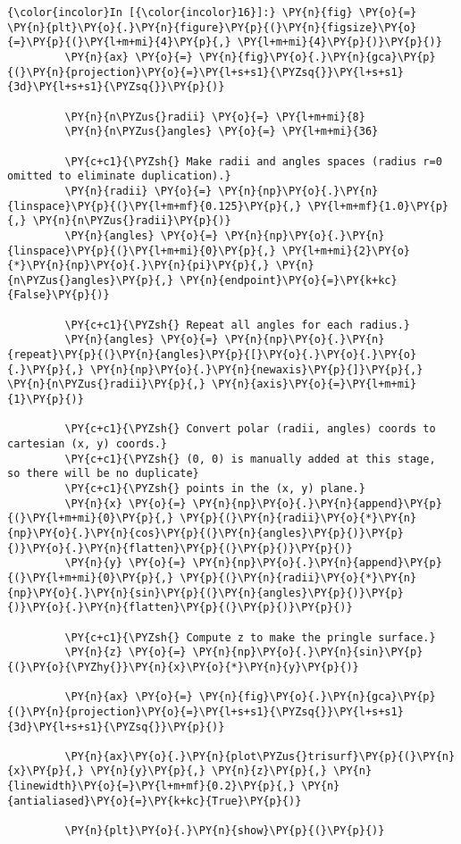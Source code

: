     \begin{Verbatim}[commandchars=\\\{\},frame=single,framerule=0.3mm,rulecolor=\color{cellframecolor}]
{\color{incolor}In [{\color{incolor}16}]:} \PY{n}{fig} \PY{o}{=} \PY{n}{plt}\PY{o}{.}\PY{n}{figure}\PY{p}{(}\PY{n}{figsize}\PY{o}{=}\PY{p}{(}\PY{l+m+mi}{4}\PY{p}{,} \PY{l+m+mi}{4}\PY{p}{)}\PY{p}{)}
         \PY{n}{ax} \PY{o}{=} \PY{n}{fig}\PY{o}{.}\PY{n}{gca}\PY{p}{(}\PY{n}{projection}\PY{o}{=}\PY{l+s+s1}{\PYZsq{}}\PY{l+s+s1}{3d}\PY{l+s+s1}{\PYZsq{}}\PY{p}{)}
         
         \PY{n}{n\PYZus{}radii} \PY{o}{=} \PY{l+m+mi}{8}
         \PY{n}{n\PYZus{}angles} \PY{o}{=} \PY{l+m+mi}{36}
         
         \PY{c+c1}{\PYZsh{} Make radii and angles spaces (radius r=0 omitted to eliminate duplication).}
         \PY{n}{radii} \PY{o}{=} \PY{n}{np}\PY{o}{.}\PY{n}{linspace}\PY{p}{(}\PY{l+m+mf}{0.125}\PY{p}{,} \PY{l+m+mf}{1.0}\PY{p}{,} \PY{n}{n\PYZus{}radii}\PY{p}{)}
         \PY{n}{angles} \PY{o}{=} \PY{n}{np}\PY{o}{.}\PY{n}{linspace}\PY{p}{(}\PY{l+m+mi}{0}\PY{p}{,} \PY{l+m+mi}{2}\PY{o}{*}\PY{n}{np}\PY{o}{.}\PY{n}{pi}\PY{p}{,} \PY{n}{n\PYZus{}angles}\PY{p}{,} \PY{n}{endpoint}\PY{o}{=}\PY{k+kc}{False}\PY{p}{)}
         
         \PY{c+c1}{\PYZsh{} Repeat all angles for each radius.}
         \PY{n}{angles} \PY{o}{=} \PY{n}{np}\PY{o}{.}\PY{n}{repeat}\PY{p}{(}\PY{n}{angles}\PY{p}{[}\PY{o}{.}\PY{o}{.}\PY{o}{.}\PY{p}{,} \PY{n}{np}\PY{o}{.}\PY{n}{newaxis}\PY{p}{]}\PY{p}{,} \PY{n}{n\PYZus{}radii}\PY{p}{,} \PY{n}{axis}\PY{o}{=}\PY{l+m+mi}{1}\PY{p}{)}
         
         \PY{c+c1}{\PYZsh{} Convert polar (radii, angles) coords to cartesian (x, y) coords.}
         \PY{c+c1}{\PYZsh{} (0, 0) is manually added at this stage,  so there will be no duplicate}
         \PY{c+c1}{\PYZsh{} points in the (x, y) plane.}
         \PY{n}{x} \PY{o}{=} \PY{n}{np}\PY{o}{.}\PY{n}{append}\PY{p}{(}\PY{l+m+mi}{0}\PY{p}{,} \PY{p}{(}\PY{n}{radii}\PY{o}{*}\PY{n}{np}\PY{o}{.}\PY{n}{cos}\PY{p}{(}\PY{n}{angles}\PY{p}{)}\PY{p}{)}\PY{o}{.}\PY{n}{flatten}\PY{p}{(}\PY{p}{)}\PY{p}{)}
         \PY{n}{y} \PY{o}{=} \PY{n}{np}\PY{o}{.}\PY{n}{append}\PY{p}{(}\PY{l+m+mi}{0}\PY{p}{,} \PY{p}{(}\PY{n}{radii}\PY{o}{*}\PY{n}{np}\PY{o}{.}\PY{n}{sin}\PY{p}{(}\PY{n}{angles}\PY{p}{)}\PY{p}{)}\PY{o}{.}\PY{n}{flatten}\PY{p}{(}\PY{p}{)}\PY{p}{)}
         
         \PY{c+c1}{\PYZsh{} Compute z to make the pringle surface.}
         \PY{n}{z} \PY{o}{=} \PY{n}{np}\PY{o}{.}\PY{n}{sin}\PY{p}{(}\PY{o}{\PYZhy{}}\PY{n}{x}\PY{o}{*}\PY{n}{y}\PY{p}{)}
         
         \PY{n}{ax} \PY{o}{=} \PY{n}{fig}\PY{o}{.}\PY{n}{gca}\PY{p}{(}\PY{n}{projection}\PY{o}{=}\PY{l+s+s1}{\PYZsq{}}\PY{l+s+s1}{3d}\PY{l+s+s1}{\PYZsq{}}\PY{p}{)}
         
         \PY{n}{ax}\PY{o}{.}\PY{n}{plot\PYZus{}trisurf}\PY{p}{(}\PY{n}{x}\PY{p}{,} \PY{n}{y}\PY{p}{,} \PY{n}{z}\PY{p}{,} \PY{n}{linewidth}\PY{o}{=}\PY{l+m+mf}{0.2}\PY{p}{,} \PY{n}{antialiased}\PY{o}{=}\PY{k+kc}{True}\PY{p}{)}
         
         \PY{n}{plt}\PY{o}{.}\PY{n}{show}\PY{p}{(}\PY{p}{)}
\end{Verbatim}
